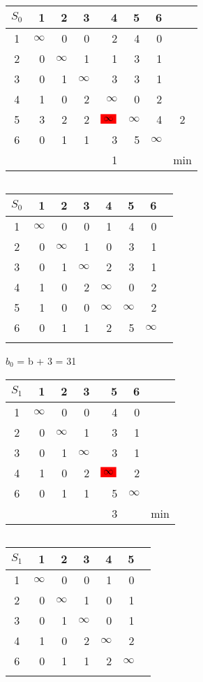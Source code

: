 \documentclass[12pt]{article}
\begin{document}
\begin{flushleft}
\begin{tabular}{c||rrrrrr||c}
$S_0$ & 1 & 2 & 3 & 4 & 5 & 6 & \\
\hline
\hline
1 & $\infty$ & 0 & 0 & 2 & 4 & 0 & \\
2 & 0 & $\infty$ & 1 & 1 & 3 & 1 & \\
3 & 0 & 1 & $\infty$ & 3 & 3 & 1 & \\
4 & 1 & 0 & 2 & $\infty$ & 0 & 2 & \\
5 & 3 & 2 & 2 & $\colorbox{red}{$\infty$}$ & $\infty$ & 4 & 2\\
6 & 0 & 1 & 1 & 3 & 5 & $\infty$ & \\
\hline
\hline
 &  &  &  & 1 & &  & min\\
\end{tabular}
$\qquad $  
\begin{tabular}{c||rrrrrr||c}
$S_0$ & 1 & 2 & 3 & 4 & 5 & 6 & \\
\hline
\hline
1 & $\infty$ & 0 & 0 & 1 & 4 & 0 & \\
2 & 0 & $\infty$ & 1 & 0 & 3 & 1 & \\
3 & 0 & 1 & $\infty$ & 2 & 3 & 1 & \\
4 & 1 & 0 & 2 & $\infty$ & 0 & 2 & \\
5 & 1 & 0 & 0 & $\infty$ & $\infty$ & 2 \\
6 & 0 & 1 & 1 & 2 & 5 & $\infty$ & \\
\hline
\hline
 &  &  &  &  &  &  & \\
\end{tabular}
\end{flushleft}

$b_0$ = b + 3 = 31

\begin{flushleft}
\begin{tabular}{c||rrrrr||c}
$S_1$ & 1 & 2 & 3  & 5 & 6\\
\hline
\hline
1 & $\infty$ & 0 & 0  & 4 & 0 & \\
2 & 0 & $\infty$ & 1  & 3 & 1 & \\
3 & 0 & 1 & $\infty$  & 3 & 1 & \\
4 & 1 & 0 & 2  & $\colorbox{red}{$\infty$}$ & 2 & \\
6 & 0 & 1 & 1  & 5 & $\infty$ & \\
\hline
\hline
 &  &  &  & 3 & & min\\
\end{tabular}
$\qquad $  
\begin{tabular}{c||rrrrr||c}
$S_1$ & 1 & 2 & 3 & 4 & 5 & \\
\hline
\hline
1 & $\infty$ & 0 & 0  & 1 & 0 & \\
2 & 0 & $\infty$ & 1  & 0 & 1 & \\
3 & 0 & 1 & $\infty$  & 0 & 1 & \\
4 & 1 & 0 & 2  & $\infty$ & 2 & \\
6 & 0 & 1 & 1  & 2 & $\infty$ & \\
\hline
\hline
 & &  &  &  & & \\
\end{tabular}
\end{flushleft}
\end{document}
